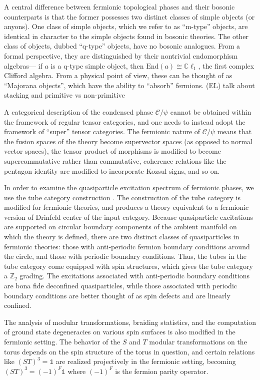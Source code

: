 \documentclass[12pt,a4paper]{article}
\newcommand{\unit}{\mathds{1}}
\newcommand{\mcc}{\mathcal{C}}
\newcommand{\zt}{\mathbb{Z}_2}
\newcommand{\End}{\text{End}}
\newcommand{\cl}{\mathbb{C}\ell}
\newcommand{\ethan}[1]{{\color{amethyst}\footnotesize{(EL) #1}}}
\begin{document}
A central difference between fermionic topological phases and their bosonic counterparts is that 
the former possesses two distinct classes of simple objects (or anyons). 
One class of simple objects, which we refer to as ``m-type'' objects, are identical in character
to the simple objects found in bosonic theories. 
The other class of objects, dubbed ``q-type'' objects, have no bosonic analogues. 
From a formal perspective, they are distinguished by their nontrivial endomorphism algebras---
if $a$ is a q-type simple object, then $\End(a) \cong \cl_1$, the first complex Clifford algebra. 
From a physical point of view, these can be thought of as ``Majorana objects'', which have the ability 
to ``absorb'' fermions. 
\ethan{talk about stacking and primitive vs non-primitive}

A categorical description of the condensed phase $\mcc / \psi$ cannot be obtained within the framework 
of regular tensor categories, and one needs to instead adopt the framework of ``super'' tensor categories. 
The fermionic nature of $\mcc / \psi$ means that the fusion spaces of the theory become supervector spaces 
(as opposed to normal vector spaces),
the tensor product of morphisms is modified to become supercommutative rather than commutative, 
coherence relations like the pentagon identity are modified to incorporate Kozsul signs, and so on.


In order to examine the quasiparticle excitation spectrum of fermionic phases, 
we use the tube category construction \cite{}.
The construction of the tube category is modified for fermionic theories, and produces a theory
equivalent to a fermionic version of Drinfeld center of the input category.
Because quasiparticle excitations are supported on circular boundary components of the ambient 
manifold on which the theory is defined, there are two distinct classes of quasiparticles in 
fermionic theories: those with anti-periodic fermion boundary conditions around the circle, and 
those with periodic boundary conditions. 
Thus, the tubes in the tube category come equipped with spin structures, which gives the tube category a $\zt$ grading. 
The excitations associated with anti-periodic boundary conditions are bona fide deconfined quasiparticles, 
while those associated with periodic boundary conditions are better thought of as spin defects and are linearly confined. 

The analysis of modular transformations, braiding statistics, and the computation of ground state degeneracies on various spin surfaces
is also modified in the fermionic setting.  
The behavior of the $S$ and $T$ modular transformations on the torus depends on the spin structure of the torus in question, and 
certain relations like $(ST)^3 = \unit$ are realized projectively in the fermionic setting, becoming 
$(ST)^3=(-1)^F\unit$ where $(-1)^F$ is the fermion parity operator. 
\end{document}
